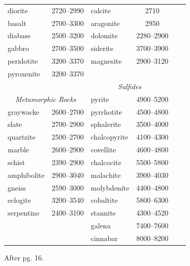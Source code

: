 \begin{table}
\begin{threeparttable}
\begin{tabular}{@{}lclclc@{}}
        diorite     & 2720--2990    & calcite       & 2710 \\
        basalt      & 2700--3300    & aragonite     & 2950 \\
        diabase     & 2500--3200    & dolomite      & 2280--2900 \\
        gabbro      & 2700--3500    & siderite      & 3700--3900 \\
        peridotite  & 3200--3370    & magnesite     & 2900--3120 \\
        pyroxenite  & 3200--3370    \\
        {}          & {}            & \multicolumn{2}{c}{\it Sulfides} \\
        \multicolumn{2}{c}{\it Metamorphic Rocks} & pyrite        & 4900--5200 \\
        graywacke   & 2600--2700    & pyrrhotite    & 4500--4800 \\
        slate       & 2700--2900    & sphalerite    & 3500--4000 \\
        quartzite   & 2500--2700    & chalcopyrite  & 4100--4300 \\
        marble      & 2600--2900    & covellite     & 4600--4800 \\
        schist      & 2390--2900    & chalcocite    & 5500--5800 \\
        amphibolite & 2900--3040    & malachite     & 3900--4030 \\
        gneiss      & 2590--3000    & molybdenite   & 4400--4800 \\
        eclogite    & 3200--3540    & cobaltite     & 5800--6300 \\
        serpentine  & 2400--3100    & stannite      & 4300--4520 \\
        {}          & {}            & galena        & 7400--7600 \\
        {}          & {}            & cinnabar      & 8000--8200 \\
        \bottomrule
    \end{tabular}
    \begin{tablenotes}
        \item After \citet{Telford_etal1990} pg. 16.
    \end{tablenotes}
    \end{threeparttable}
\end{table}